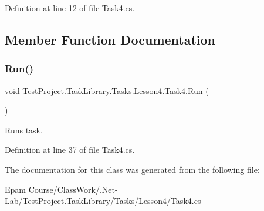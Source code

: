 Definition at line 12 of file Task4.\+cs.



\subsection{Member Function Documentation}
\mbox{\label{class_test_project_1_1_task_library_1_1_tasks_1_1_lesson4_1_1_task4_a28ae5c4fe1bd36fbf6107fbd51e66f74}} 
\subsubsection{\texorpdfstring{Run()}{Run()}}
{\footnotesize\ttfamily void Test\+Project.\+Task\+Library.\+Tasks.\+Lesson4.\+Task4.\+Run (\begin{DoxyParamCaption}{ }\end{DoxyParamCaption})}



Runs task. 



Definition at line 37 of file Task4.\+cs.



The documentation for this class was generated from the following file\+:\begin{DoxyCompactItemize}
\item 
Epam Course/\+Class\+Work/.\+Net-\/\+Lab/\+Test\+Project.\+Task\+Library/\+Tasks/\+Lesson4/Task4.\+cs\end{DoxyCompactItemize}
